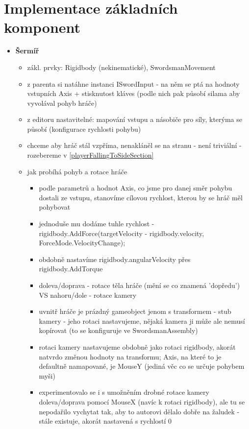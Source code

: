 \section{Implementace základních komponent}
\begin{itemize}
  \item \textbf{Šermíř}
    \begin{itemize}
      \item zákl. prvky: Rigidbody (nekinematické), SwordsmanMovement
      \item z parenta si natáhne instanci ISwordInput - na něm se ptá na hodnoty vstupních Axis + stisknutost kláves (podle nich pak působí silama aby vyvolával pohyb hráče)
      \item z editoru nastavitelné: mapování vstupu a násobiče pro síly, kterýma se působí (konfigurace rychlosti pohybu)
      \item chceme aby hráč stál vzpříma, nenakláněl se na stranu - není triviální - rozebereme v \ref{playerFallingToSideSection}
      \item jak probíhá pohyb a rotace hráče
        \begin{itemize}
          \item podle parametrů a hodnot Axis, co jsme pro danej směr pohybu dostali ze vstupu, stanovíme cílovou rychlost, kterou by se hráč měl pohybovat
          \item jednoduše mu dodáme tuhle rychlost - rigidbody.AddForce(targetVelocity - rigidbody.velocity, ForceMode.VelocityChange); 
          \item obdobně nastavíme rigidbody.angularVelocity přes rigidbody.AddTorque
          \item doleva/doprava - rotace těla hráče (mění se co znamená 'dopředu') VS nahoru/dole - rotace kamery
          \item uvnitř hráče je prázdný gameobject jenom s transformem - stub kamery - jeho rotaci nastavujeme, nějaká kamera ji může ale nemusí kopírovat (to se konfiguruje ve SwordsmanAssembly)
          \item rotaci kamery nastavujeme obdobně jako rotaci rigidbody, akorát natvrdo změnou hodnoty na transformu; Axis, na které to je defaultně namapované, je MouseY (jediná věc co se určuje pohybem myši)
          \item experimentovalo se i s umožněním drobné rotace kamery doleva/doprava pomocí MouseX (navíc k rotaci rigidbody), ale tu se nepodařilo vychytat tak, aby to autorovi dělalo dobře na žaludek - stále existuje, akorát nastavená s rychlostí 0

\end{itemize}
\end{itemize}
\end{itemize}

